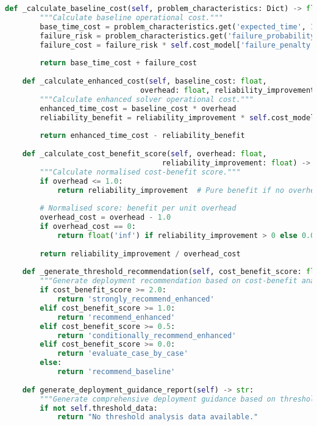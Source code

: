 \begin{lstlisting}[language=Python, caption=Cost-Benefit Threshold Analysis for Deployment Guidance]
    def _calculate_baseline_cost(self, problem_characteristics: Dict) -> float:
        """Calculate baseline operational cost."""
        base_time_cost = problem_characteristics.get('expected_time', 1.0) * self.cost_model['time_cost_factor']
        failure_risk = problem_characteristics.get('failure_probability', 0.1)
        failure_cost = failure_risk * self.cost_model['failure_penalty']
        
        return base_time_cost + failure_cost
    
    def _calculate_enhanced_cost(self, baseline_cost: float, 
                               overhead: float, reliability_improvement: float) -> float:
        """Calculate enhanced solver operational cost."""
        enhanced_time_cost = baseline_cost * overhead
        reliability_benefit = reliability_improvement * self.cost_model['reliability_value']
        
        return enhanced_time_cost - reliability_benefit
    
    def _calculate_cost_benefit_score(self, overhead: float, 
                                    reliability_improvement: float) -> float:
        """Calculate normalised cost-benefit score."""
        if overhead <= 1.0:
            return reliability_improvement  # Pure benefit if no overhead
        
        # Normalised score: benefit per unit overhead
        overhead_cost = overhead - 1.0
        if overhead_cost == 0:
            return float('inf') if reliability_improvement > 0 else 0.0
        
        return reliability_improvement / overhead_cost
    
    def _generate_threshold_recommendation(self, cost_benefit_score: float) -> str:
        """Generate deployment recommendation based on cost-benefit analysis."""
        if cost_benefit_score >= 2.0:
            return 'strongly_recommend_enhanced'
        elif cost_benefit_score >= 1.0:
            return 'recommend_enhanced'
        elif cost_benefit_score >= 0.5:
            return 'conditionally_recommend_enhanced'
        elif cost_benefit_score >= 0.0:
            return 'evaluate_case_by_case'
        else:
            return 'recommend_baseline'
    
    def generate_deployment_guidance_report(self) -> str:
        """Generate comprehensive deployment guidance based on threshold analysis."""
        if not self.threshold_data:
            return "No threshold analysis data available."
        

\end{lstlisting}
